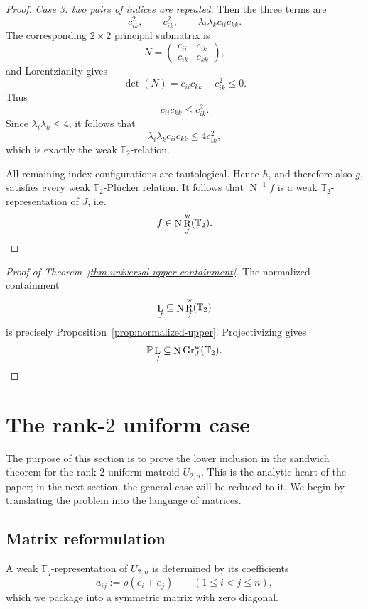\documentclass[12pt]{amsart}
\theoremstyle{definition}
\newcommand{\1}{\mathbf{1}}
\DeclareMathOperator{\upN}{N}   %
\DeclareMathOperator{\upL}{L}   %
\DeclareMathOperator{\upR}{R}   %
\newcommand\T{{\mathbb T}}
\begin{document}
\begin{proof}
\emph{Case 3: two pairs of indices are repeated.}
Then the three terms are
\[
c_{ik}^2,\qquad c_{ik}^2,\qquad \lambda_i\lambda_k c_{ii}c_{kk}.
\]
The corresponding $2\times 2$ principal submatrix is
\[
N=
\begin{pmatrix}
c_{ii} & c_{ik}\\
c_{ik} & c_{kk}
\end{pmatrix},
\]
and Lorentzianity gives
\[
\det(N)=c_{ii}c_{kk}-c_{ik}^2\le 0.
\]
Thus
\[
c_{ii}c_{kk}\le c_{ik}^2.
\]
Since $\lambda_i\lambda_k\le 4$, it follows that
\[
\lambda_i\lambda_k c_{ii}c_{kk}\le 4c_{ik}^2,
\]
which is exactly the weak $\T_2$-relation.

\smallskip

All remaining index configurations are tautological. Hence $h$, and therefore also
$g$, satisfies every weak $\T_2$-Pl\"ucker relation. It follows that $\upN^{-1}f$ is a
weak $\T_2$-representation of $J$, i.e.
\[
f\in \upN \upR_J^{\rm w}(\T_2).\qedhere    
\]
\end{proof}

\begin{proof}[Proof of Theorem~\ref{thm:universal-upper-containment}]
The normalized containment
\[
\upL_J\subseteq \upN \upR_J^{\rm w}(\mathbb T_2)
\]
is precisely Proposition~\ref{prop:normalized-upper}.  Projectivizing gives
\begin{equation*}
\mathbb P \upL_J\subseteq \upN\operatorname{Gr}^{\rm w}_J(\mathbb T_2).\qedhere    
\end{equation*}
\end{proof}


\section{The rank-\texorpdfstring{$2$}{2} uniform case}
\label{sec:U2n-core}

The purpose of this section is to prove the lower inclusion in the sandwich theorem for the
rank-$2$ uniform matroid $U_{2,n}$. This is the analytic heart of the paper; in the next
section, the general case will be reduced to it.
We begin by translating the problem into the language of matrices.

\subsection{Matrix reformulation}

A weak $\T_q$-representation of $U_{2,n}$ is determined by its coefficients
\[
a_{ij} := \rho(e_i+e_j)\qquad (1\le i<j\le n),
\]
which we package into a symmetric matrix with zero diagonal.
\end{document}
